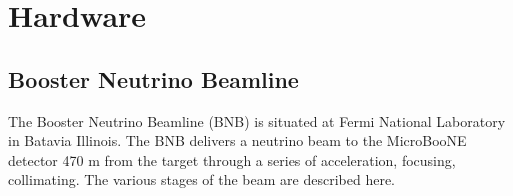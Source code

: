 \documentclass[12pt]{article}
\begin{document}



\newpage

\section{Hardware} \label{sec:hardware}
\subsection{Booster Neutrino Beamline}
The Booster Neutrino Beamline (BNB) is situated at Fermi National Laboratory in Batavia Illinois.  The BNB delivers a neutrino beam to the MicroBooNE detector 470 m from the target through a series of acceleration, focusing, collimating. The various stages of the beam are described here.  
\end{document}
